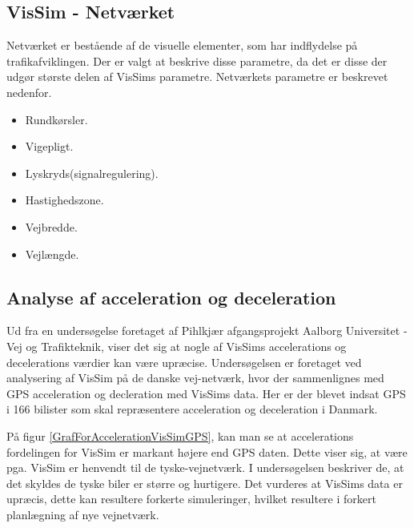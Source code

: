 \subsection*{VisSim - Netværket}
Netværket er bestående af de visuelle elementer, som har indflydelse på trafikafviklingen. Der er valgt at beskrive disse parametre, da det er disse der udgør største delen af VisSims parametre.
Netværkets parametre er beskrevet nedenfor.

\begin{itemize}
\item Rundkørsler.
\item Vigepligt.
\item Lyskryds(signalregulering).
\item Hastighedszone.
\item Vejbredde.
\item Vejlængde.
\end{itemize}

\subsection*{Analyse af acceleration og deceleration}
Ud fra en undersøgelse foretaget af Pihlkjær afgangsprojekt Aalborg Universitet - Vej og Trafikteknik, viser det sig at nogle af VisSims accelerations og decelerations værdier kan være upræcise. Undersøgelsen er foretaget ved analysering af VisSim på de danske vej-netværk, hvor der sammenlignes med GPS acceleration og decleration med VisSims data. Her er der blevet indsat GPS i 166 bilister som skal repræsentere acceleration og deceleration i Danmark.

På figur \ref{GrafForAccelerationVisSimGPS}, kan man se at accelerations fordelingen for VisSim er markant højere end GPS daten. Dette viser sig, at være pga. VisSim er henvendt til de tyske-vejnetværk. I undersøgelsen beskriver de, at det skyldes de tyske biler er større og hurtigere. Det vurderes at VisSims data er upræcis, dette kan resultere forkerte simuleringer, hvilket resultere i forkert planlægning af nye vejnetværk. \cite{TrafiksimuleringVisSim}

